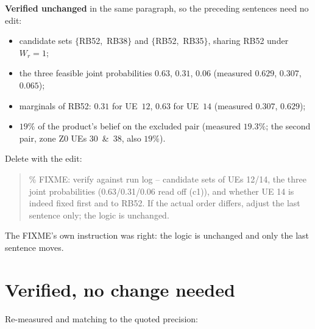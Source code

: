 \documentclass[10pt]{article}
\begin{document}
\medskip\noindent\textbf{Verified unchanged} in the same paragraph, so the
preceding sentences need no edit:
%
\begin{itemize}\itemsep2pt
  \item candidate sets $\{$RB52,~RB38$\}$ and $\{$RB52,~RB35$\}$, sharing
        RB52 under $W_r=1$;
  \item the three feasible joint probabilities $0.63$, $0.31$, $0.06$
        (measured $0.629$, $0.307$, $0.065$);
  \item marginals of RB52: $0.31$ for UE~$12$, $0.63$ for UE~$14$
        (measured $0.307$, $0.629$);
  \item $19\%$ of the product's belief on the excluded pair (measured
        $19.3\%$; the second pair, zone Z0 UEs $30$~\&~$38$, also $19\%$).
\end{itemize}

\medskip\noindent Delete with the edit:
\begin{quote}\ttfamily\footnotesize
\% FIXME: verify against run log -- candidate sets of UEs 12/14, the three
joint probabilities (0.63/0.31/0.06 read off (c1)), and whether UE 14 is
indeed fixed first and to RB52. If the actual order differs, adjust the
last sentence only; the logic is unchanged.
\end{quote}
\noindent The FIXME's own instruction was right: the logic is unchanged and
only the last sentence moves.

\section*{Verified, no change needed}

Re-measured and matching to the quoted precision:
\end{document}
